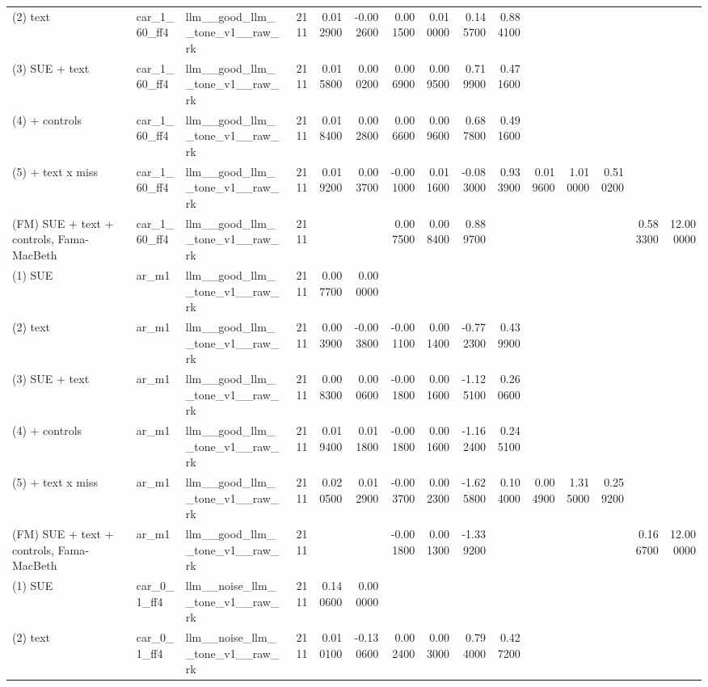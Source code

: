 \begin{table}
\begin{tabular}{lllrrrrrrrrrrrr}
(2) text & car\_1\_60\_ff4 & llm\_\_good\_llm\_\_tone\_v1\_\_raw\_rk & 2111 & 0.012900 & -0.002600 & 0.001500 & 0.010000 & 0.145700 & 0.884100 &  &  &  &  &  \\
(3) SUE + text & car\_1\_60\_ff4 & llm\_\_good\_llm\_\_tone\_v1\_\_raw\_rk & 2111 & 0.015800 & 0.000200 & 0.006900 & 0.009500 & 0.719900 & 0.471600 &  &  &  &  &  \\
(4) + controls & car\_1\_60\_ff4 & llm\_\_good\_llm\_\_tone\_v1\_\_raw\_rk & 2111 & 0.018400 & 0.002800 & 0.006600 & 0.009600 & 0.687800 & 0.491600 &  &  &  &  &  \\
(5) + text x miss & car\_1\_60\_ff4 & llm\_\_good\_llm\_\_tone\_v1\_\_raw\_rk & 2111 & 0.019200 & 0.003700 & -0.001000 & 0.011600 & -0.083000 & 0.933900 & 0.019600 & 1.010000 & 0.510200 &  &  \\
(FM) SUE + text + controls, Fama-MacBeth & car\_1\_60\_ff4 & llm\_\_good\_llm\_\_tone\_v1\_\_raw\_rk & 2111 &  &  & 0.007500 & 0.008400 & 0.889700 &  &  &  &  & 0.583300 & 12.000000 \\
(1) SUE & ar\_m1 & llm\_\_good\_llm\_\_tone\_v1\_\_raw\_rk & 2111 & 0.007700 & 0.000000 &  &  &  &  &  &  &  &  &  \\
(2) text & ar\_m1 & llm\_\_good\_llm\_\_tone\_v1\_\_raw\_rk & 2111 & 0.003900 & -0.003800 & -0.001100 & 0.001400 & -0.772300 & 0.439900 &  &  &  &  &  \\
(3) SUE + text & ar\_m1 & llm\_\_good\_llm\_\_tone\_v1\_\_raw\_rk & 2111 & 0.008300 & 0.000600 & -0.001800 & 0.001600 & -1.125100 & 0.260600 &  &  &  &  &  \\
(4) + controls & ar\_m1 & llm\_\_good\_llm\_\_tone\_v1\_\_raw\_rk & 2111 & 0.019400 & 0.011800 & -0.001800 & 0.001600 & -1.162400 & 0.245100 &  &  &  &  &  \\
(5) + text x miss & ar\_m1 & llm\_\_good\_llm\_\_tone\_v1\_\_raw\_rk & 2111 & 0.020500 & 0.012900 & -0.003700 & 0.002300 & -1.625800 & 0.104000 & 0.004900 & 1.315000 & 0.259200 &  &  \\
(FM) SUE + text + controls, Fama-MacBeth & ar\_m1 & llm\_\_good\_llm\_\_tone\_v1\_\_raw\_rk & 2111 &  &  & -0.001800 & 0.001300 & -1.339200 &  &  &  &  & 0.166700 & 12.000000 \\
(1) SUE & car\_0\_1\_ff4 & llm\_\_noise\_llm\_\_tone\_v1\_\_raw\_rk & 2111 & 0.140600 & 0.000000 &  &  &  &  &  &  &  &  &  \\
(2) text & car\_0\_1\_ff4 & llm\_\_noise\_llm\_\_tone\_v1\_\_raw\_rk & 2111 & 0.010100 & -0.130600 & 0.002400 & 0.003000 & 0.794000 & 0.427200 &  &  &  &  &  \\

\end{tabular}
\end{table}
